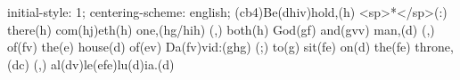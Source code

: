 initial-style: 1;
centering-scheme: english;
(cb4)Be(dhiv)hold,(h) <sp>*</sp>(:) there(h) com(hj)eth(h) one,(hg/hih) (,) both(h) God(gf) and(gvv) man,(d) (,) of(fv) the(e) house(d) of(ev) Da(fv)vid:(ghg) (;) to(g) sit(fe) on(d) the(fe) throne,(dc) (,) al(dv)le(efe)lu(d)ia.(d)
